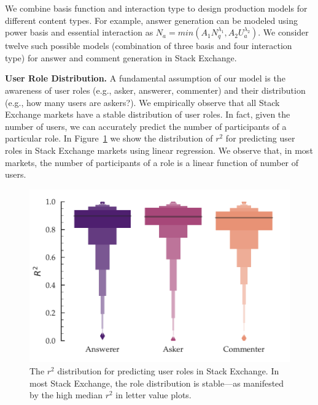 \begin{table}[h!]
\begin{tabular}{m{}c}
\begin{minipage}{.17\textwidth}
    \end{minipage}
    \\
    \bottomrule
  \end{tabular}
  \vspace{-\baselineskip}
\end{table}

We combine basis function and interaction type to design production models for different content types. For example, answer generation can be modeled using power basis and essential interaction as $N_a = min(A_1N_q^{\lambda_1},A_2U_a^{\lambda_2})$. We consider twelve such possible models (combination of three basis and four interaction type) for answer and comment generation in Stack Exchange.

\textbf{User Role Distribution.} A fundamental assumption of our model is the awareness of user roles (e.g., asker, answerer, commenter) and their distribution (e.g., how many users are askers?). We empirically observe that all Stack Exchange markets have a stable distribution of user roles. In fact, given the number of users, we can accurately predict the number of participants of a particular role. In Figure~\ref{fig:roles} we show the distribution of $r^2$ for predicting user roles in Stack Exchange markets using linear regression. We observe that, in most markets, the number of participants of a role is a linear function of number of users.

\begin{figure}[hbt]
\centering
\includegraphics[scale=0.45]{Figures/User_to_Roles_R_Squared_LV.pdf}
\caption{The $r^2$ distribution for predicting user roles in Stack Exchange. In most Stack Exchange, the role distribution is stable---as manifested by the high median $r^2$ in letter value plots.}
\label{fig:roles}
\end{figure}

